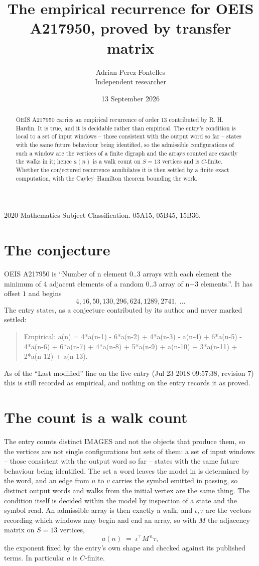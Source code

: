 \documentclass[11pt,a4paper]{article}
\title{The empirical recurrence for OEIS A217950, proved by transfer matrix}
\author{Adrian Perez Fontelles\\ \small Independent researcher}
\date{13 September 2026}
\theoremstyle{plain}
\theoremstyle{definition}
\begin{document}
\maketitle

\begin{abstract}
OEIS A217950 carries an empirical recurrence of order $13$ contributed by R. H. Hardin. It is
true, and it is decidable rather than empirical. The entry's condition is local to a set of input windows -- those consistent with the output word so far -- states with the same future behaviour being identified, so
the admissible configurations of such a window are the vertices of a finite digraph and the
arrays counted are exactly the walks in it; hence $a(n)$ is a walk count on $S=13$ vertices
and is $C$-finite. Whether the conjectured recurrence annihilates it is then settled by a
finite exact computation, with the Cayley--Hamilton theorem bounding the work.
\end{abstract}

\noindent\small 2020 Mathematics Subject Classification. 05A15, 05B45, 15B36.\normalsize

\section{The conjecture}

OEIS A217950 is ``Number of n element 0..3 arrays with each element the minimum of 4 adjacent elements of a random 0..3 array of n+3 elements.''. It has offset $1$ and begins
\[
4, 16, 50, 130, 296, 624, 1289, 2741,\ \dots
\]
The entry states, as a conjecture contributed by its author and never marked settled:
\begin{quote}
Empirical: a(n) = 4*a(n-1) - 6*a(n-2) + 4*a(n-3) - a(n-4) + 6*a(n-5) - 4*a(n-6) + 6*a(n-7) + 4*a(n-8) + 5*a(n-9) + a(n-10) + 3*a(n-11) + 2*a(n-12) + a(n-13).
\end{quote}
As of the ``Last modified'' line on the live entry (Jul 23 2018 09:57:38, revision 7) this is still
recorded as empirical, and nothing on the entry records it as proved.

\section{The count is a walk count}

The entry counts distinct IMAGES and not the objects that produce them, so the vertices are not single configurations but sets of them: a set of input windows -- those consistent with the output word so far -- states with the same future behaviour being identified. The set a word leaves the model in is determined by the word, and an edge from $u$ to $v$ carries the symbol emitted in passing, so distinct output words and walks from the initial vertex are the same thing. The condition itself is decided within the model by inspection of a state and the symbol read.
An admissible array is then exactly a walk, and $\iota,\tau$ are the vectors recording which windows may begin and end an array, so with $M$ the adjacency matrix on $S=13$ vertices,
\[
a(n)\;=\;\iota^{\!\top}M^{\,n}\tau ,
\]
the exponent fixed by the entry's own shape and checked against its published terms. In
particular $a$ is $C$-finite.
\end{document}
